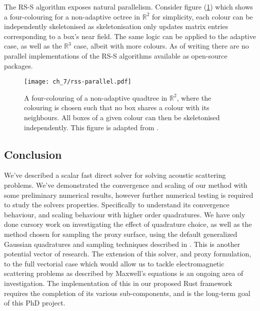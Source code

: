The RS-S algorithm exposes natural parallelism. Consider figure (\ref{fig:ch_7:rss_parallel}) which shows a four-colouring for a non-adaptive octree in $\mathbb{R}^2$ for simplicity, each colour can be independently skeletonised as skeletonisation only updates matrix entries corresponding to a box's near field. The same logic can be applied to the adaptive case, as well as the $\mathbb{R}^3$ case, albeit with more colours. As of writing there are no parallel implementations of the RS-S algorithms available as open-source packages.

\begin{figure}
    \centering
    \texttt{[image: ch\_7/rss-parallel.pdf]}
    \caption{A four-colouring of a non-adaptive quadtree in $\mathbb{R}^2$, where the colouring is chosen such that no box shares a colour with its neighbours. All boxes of a given colour can then be skeletonised independently. This figure is adapted from \cite{minden2017recursive}.}
    \label{fig:ch_7:rss_parallel}
\end{figure}

\subsection*{Conclusion}

We've described a scalar fast direct solver for solving acoustic scattering problems. We've demonstrated the convergence and scaling of our method with some preliminary numerical results, however further numerical testing is required to study the solvers properties. Specifically to understand its convergence behaviour, and scaling behaviour with higher order quadratures. We have only done cursory work on investigating the effect of quadrature choice, as well as the method chosen for sampling the proxy surface, using the default generalized Gaussian quadratures and sampling techniques described in \cite{sushnikova2022fmm}. This is another potential vector of research. The extension of this solver, and proxy formulation, to the full vectorial case which would allow us to tackle electromagnetic scattering problems as described by Maxwell's equations is an ongoing area of investigation. The implementation of this in our proposed Rust framework requires the completion of its various sub-components, and is the long-term goal of this PhD project.
